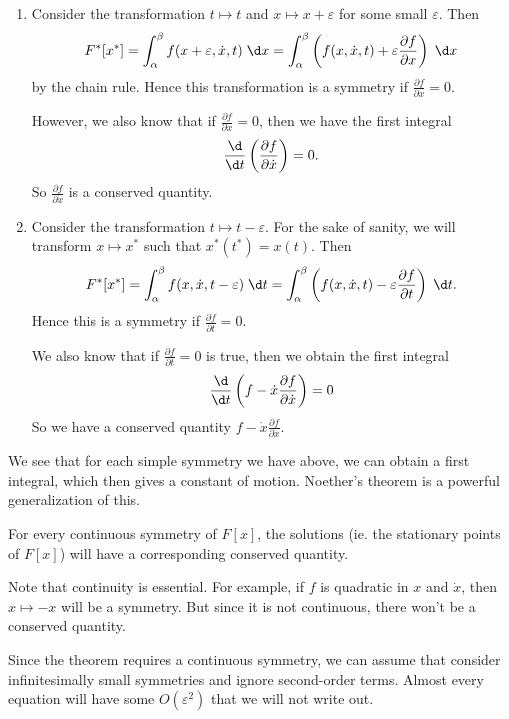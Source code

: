 \documentclass[a4paper]{article}
\begin{document}
\begin{eg}\leavevmode
  \begin{enumerate}
    \item Consider the transformation $t \mapsto t$ and $x \mapsto x + \varepsilon$ for some small $\varepsilon$. Then
      \[
        F^*[x^*] = \int_\alpha^\beta f(x + \varepsilon, \dot{x}, t)\;\d x = \int_\alpha^\beta \left(f(x, \dot{x}, t) + \varepsilon \frac{\partial f}{\partial x}\right)\;\d x
      \]
      by the chain rule. Hence this transformation is a symmetry if $\frac{\partial f}{\partial x} = 0$.

      However, we also know that if $\frac{\partial f}{\partial x} = 0$, then we have the first integral
      \[
        \frac{\d}{\d t}\left(\frac{\partial f}{\partial \dot{x}}\right) = 0.
      \]
      So $\frac{\partial f}{\partial \dot{x}}$ is a conserved quantity.
    \item Consider the transformation $t \mapsto t - \varepsilon$. For the sake of sanity, we will transform $x\mapsto x^*$ such that $x^*(t^*) = x(t)$. Then
      \[
        F^*[x^*] = \int_\alpha^\beta f(x, \dot{x}, t - \varepsilon)\;\d t = \int_\alpha^\beta \left(f(x, \dot{x}, t) - \varepsilon \frac{\partial f}{\partial t}\right)\;\d t.
      \]
      Hence this is a symmetry if $\frac{\partial f}{\partial t} = 0$.

      We also know that if $\frac{\partial f}{\partial t} = 0$ is true, then we obtain the first integral
      \[
        \frac{\d}{\d t}\left(f - \dot{x}\frac{\partial f}{\partial \dot{x}}\right) = 0
      \]
      So we have a conserved quantity $f - \dot{x}\frac{\partial f}{\partial \dot{x}}$.
  \end{enumerate}
\end{eg}
We see that for each simple symmetry we have above, we can obtain a first integral, which then gives a constant of motion. Noether's theorem is a powerful generalization of this.

\begin{thm}
  For every continuous symmetry of $F[x]$, the solutions (ie. the stationary points of $F[x]$) will have a corresponding conserved quantity.
\end{thm}
Note that continuity is essential. For example, if $f$ is quadratic in $x$ and $\dot{x}$, then $x\mapsto -x$ will be a symmetry. But since it is not continuous, there won't be a conserved quantity.

Since the theorem requires a continuous symmetry, we can assume that consider infinitesimally small symmetries and ignore second-order terms. Almost every equation will have some $O(\varepsilon^2)$ that we will not write out.
\end{document}
